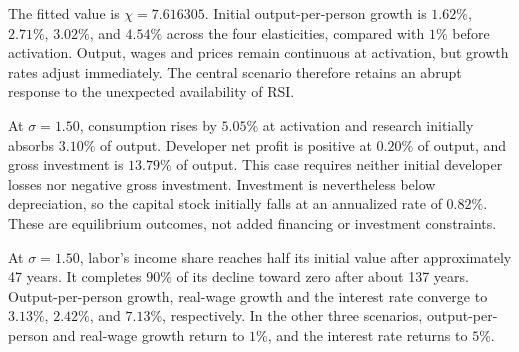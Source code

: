 The fitted value is $\chi=7.616305$. Initial output-per-person growth is
$1.62\%$, $2.71\%$, $3.02\%$, and $4.54\%$ across the four elasticities,
compared with $1\%$ before activation.
Output, wages and prices remain continuous at activation, but growth
rates adjust immediately. The central scenario therefore retains an
abrupt response to the unexpected availability of RSI.

At $\sigma=1.50$, consumption rises by $5.05\%$ at activation and
research initially absorbs $3.10\%$ of output. Developer net profit is
positive at $0.20\%$ of output, and gross investment is $13.79\%$ of output.
This case requires neither initial developer losses nor negative gross
investment. Investment is nevertheless below depreciation, so the capital stock
initially falls at an annualized rate of $0.82\%$. These are equilibrium
outcomes, not added financing or investment constraints.

At $\sigma=1.50$, labor's income share reaches half its initial value after
approximately 47 years. It completes $90\%$ of its decline toward zero after
about 137 years. Output-per-person growth, real-wage growth and the interest
rate converge to $3.13\%$, $2.42\%$, and $7.13\%$, respectively. In the other
three scenarios, output-per-person and real-wage growth return to $1\%$,
and the interest rate returns to $5\%$.
